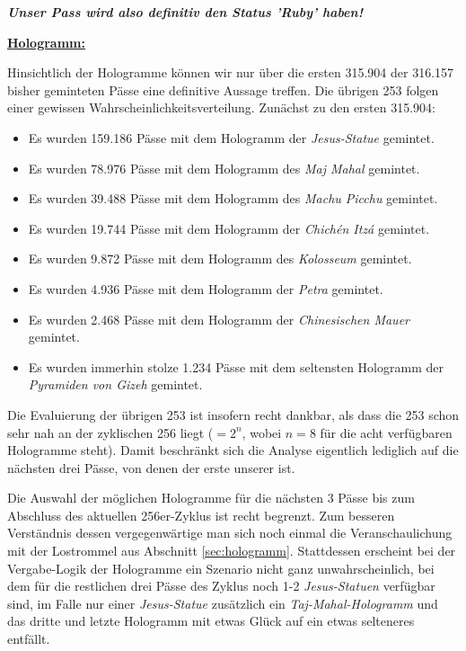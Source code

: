 \vspace{0.2cm}

\textit{\textbf{Unser Pass wird also definitiv den Status 'Ruby' haben!}}

\vspace{1.0cm}


\underline{\textbf{Hologramm:}}

\vspace{0.2cm}

Hinsichtlich der Hologramme können wir nur über die ersten 315.904 der 316.157 bisher geminteten Pässe eine definitive Aussage treffen. Die übrigen 253 folgen einer gewissen Wahrscheinlichkeitsverteilung. Zunächst zu den ersten 315.904:

\begin{itemize}
  \item Es wurden 159.186 Pässe mit dem Hologramm der \textit{Jesus-Statue} gemintet.
  \item Es wurden 78.976 Pässe mit dem Hologramm des \textit{Maj Mahal} gemintet.
  \item Es wurden 39.488 Pässe mit dem Hologramm des \textit{Machu Picchu} gemintet.
  \item Es wurden 19.744 Pässe mit dem Hologramm der \textit{Chichén Itzá} gemintet.
  \item Es wurden 9.872 Pässe mit dem Hologramm des \textit{Kolosseum} gemintet.
  \item Es wurden 4.936 Pässe mit dem Hologramm der \textit{Petra} gemintet.
  \item Es wurden 2.468 Pässe mit dem Hologramm der \textit{Chinesischen Mauer} gemintet.
  \item Es wurden immerhin stolze 1.234 Pässe mit dem seltensten Hologramm der \textit{Pyramiden von Gizeh} gemintet.
\end{itemize}

\vspace{0.3cm}

Die Evaluierung der übrigen 253 ist insofern recht dankbar, als dass die 253 schon sehr nah an der zyklischen 256 liegt ($= 2^{n}$, wobei $n=8$ für die acht verfügbaren Hologramme steht). Damit beschränkt sich die Analyse eigentlich lediglich auf die nächsten drei Pässe, von denen der erste unserer ist. 

Die Auswahl der möglichen Hologramme für die nächsten 3 Pässe bis zum Abschluss des aktuellen 256er-Zyklus ist recht begrenzt. Zum besseren Verständnis dessen vergegenwärtige man sich noch einmal die Veranschaulichung mit der Lostrommel aus Abschnitt \ref{sec:hologramm}. Stattdessen erscheint bei der Vergabe-Logik der Hologramme ein Szenario nicht ganz unwahrscheinlich, bei dem für die restlichen drei Pässe des Zyklus noch 1-2 \textit{Jesus-Statuen} verfügbar sind, im Falle nur einer \textit{Jesus-Statue} zusätzlich ein \textit{Taj-Mahal-Hologramm} und das dritte und letzte Hologramm mit etwas Glück auf ein etwas selteneres entfällt.


